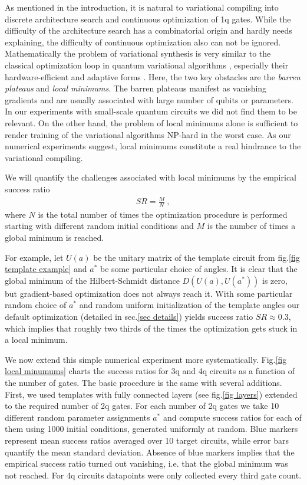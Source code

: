 \documentclass[twocolumn, amsfonts, amssymb, aps, nofootinbib]{revtex4-2}
\begin{document}
As mentioned in the introduction, it is natural to variational compiling into discrete architecture search and continuous optimization of 1q gates. While the difficulty of the architecture search has a combinatorial origin and hardly needs explaining, the difficulty of continuous optimization also can not be ignored. Mathematically the problem of variational synthesis is very similar to the classical optimization loop in quantum variational algorithms \cite{McClean2016}, especially their hardware-efficient \cite{Kandala2017} and adaptive \cite{Tang2021} forms . Here, the two key obstacles are the \textit{barren plateaus} and \textit{local minimums}. The barren plateaus \cite{McClean2018}  manifest as vanishing gradients and are usually associated with large number of qubits or parameters. In our experiments with small-scale quantum circuits we did not find them to be relevant. On the other hand, the problem of local minimums alone is sufficient to render training of the variational algorithms NP-hard \cite{Bittel2021} in the worst case. As our numerical experiments suggest, local minimums constitute a real hindrance to the variational compiling.

We will quantify the challenges associated with local minimums by the empirical success ratio
\begin{align}
	SR=\frac{M}{N} \ ,
\end{align}
where $N$ is the total number of times the optimization procedure is performed starting with different random initial conditions and $M$ is the number of times a global minimum is reached. 

For example, let $U(a)$ be the unitary matrix of the template circuit from fig.\ref{fig template example} and $a^*$ be some particular choice of angles. It is clear that the global minimum of the Hilbert-Schmidt distance $D(U(a), U(a^*))$ is zero, but gradient-based optimization does not always reach it. With some particular random choice of $a^*$ and random uniform initialization of the template angles our default optimization (detailed in sec.\ref{sec details}) yields success ratio $SR\approx0.3$, which implies that roughly two thirds of the times the optimization gets stuck in a local minimum. 

We now extend this simple numerical experiment more systematically. Fig.\ref{fig local minumums} charts the success ratios for 3q and 4q circuits as a function of the number of gates. The basic procedure is the same with several additions. First, we used templates with fully connected layers (see fig.\ref{fig layers}) extended to the required number of 2q gates. For each number of 2q gates we take 10 different random parameter assignments $a^*$ and compute success ratios for each of them using 1000 initial conditions, generated uniformly at random. Blue markers represent mean success ratios averaged over 10 target circuits, while error bars quantify the mean standard deviation. Absence of blue markers implies that the empirical success ratio turned out vanishing, i.e. that the global minimum was not reached. For 4q circuits datapoints were only collected every third gate count.
\end{document}

